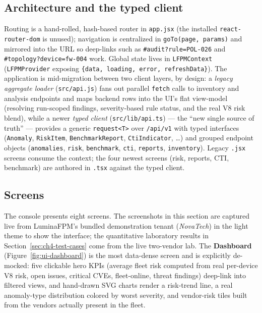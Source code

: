 \documentclass[12pt,a4paper]{report}
\renewcommand{\_}{\textunderscore\allowbreak}
\begin{document}
\subsection*{Architecture and the typed client}

Routing is a hand-rolled, hash-based router in \texttt{app.jsx} (the installed \texttt{react-router-dom} is unused); navigation is centralized in \texttt{goTo(page, params)} and mirrored into the URL so deep-links such as \texttt{\#audit?rule=POL-026} and \texttt{\#topology?device=fw-004} work. Global state lives in \texttt{LFPMContext} (\texttt{LFPMProvider} exposing \texttt{\{data, loading, error, refreshData\}}). The application is mid-migration between two client layers, by design: a \emph{legacy aggregate loader} (\texttt{src/api.js}) fans out parallel \texttt{fetch} calls to inventory and analysis endpoints and maps backend rows into the UI's flat view-model (resolving run-scoped findings, severity-based rule status, and the real V8 risk blend), while a newer \emph{typed client} (\texttt{src/lib/api.ts}) --- the ``new single source of truth'' --- provides a generic \texttt{request<T>} over \texttt{/api/v1} with typed interfaces (\texttt{Anomaly}, \texttt{RiskItem}, \texttt{BenchmarkReport}, \texttt{CtiIndicator}, \dots) and grouped endpoint objects (\texttt{anomalies}, \texttt{risk}, \texttt{benchmark}, \texttt{cti}, \texttt{reports}, \texttt{inventory}). Legacy \texttt{.jsx} screens consume the context; the four newest screens (risk, reports, CTI, benchmark) are authored in \texttt{.tsx} against the typed client.

\subsection*{Screens}

The console presents eight screens. The screenshots in this section are captured live from LuminaFPM's bundled demonstration tenant (\emph{NovaTech}) in the light theme to show the interface; the quantitative laboratory results in Section~\ref{sec:ch4-test-cases} come from the live two-vendor lab. The \textbf{Dashboard} (Figure~\ref{fig:ui-dashboard}) is the most data-dense screen and is explicitly de-mocked: five clickable hero KPIs (average fleet risk computed from real per-device V8 risk, open issues, critical CVEs, fleet-online, threat findings) deep-link into filtered views, and hand-drawn SVG charts render a risk-trend line, a real anomaly-type distribution colored by worst severity, and vendor-risk tiles built from the vendors actually present in the fleet.
\end{document}
